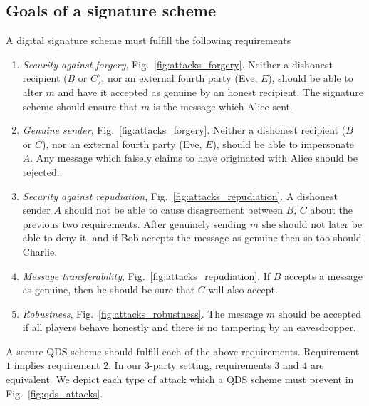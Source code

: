 \subsection{Goals of a signature scheme}\label{sec:qds_goals}

A digital signature scheme must fulfill the following requirements

\begin{mylist}
\begin{enumerate}
\item\emph{Security against forgery}, Fig.~\ref{fig:attacks_forgery}. Neither a dishonest recipient ($B$ or $C$), nor an external fourth party (Eve, $E$), should be able to alter $m$ and have it accepted as genuine by an honest recipient. The signature scheme should ensure that $m$ is the message which Alice sent.

\item\emph{Genuine sender}, Fig.~\ref{fig:attacks_forgery}. Neither a dishonest recipient ($B$ or $C$), nor an external fourth party (Eve, $E$), should be able to impersonate $A$. Any message which falsely claims to have originated with Alice should be rejected.

\item\emph{Security against repudiation}, Fig.~\ref{fig:attacks_repudiation}. A dishonest sender $A$ should not be able to cause disagreement between $B$, $C$ about the previous two requirements. After genuinely sending $m$ she should not later be able to deny it, and if Bob accepts the message as genuine then so too should Charlie. 

\item \emph{Message transferability}, Fig.~\ref{fig:attacks_repudiation}. If $B$ accepts a message as genuine, then he should be sure that $C$ will also accept.

\item \emph{Robustness}, Fig.~\ref{fig:attacks_robustness}. The message $m$ should be accepted if all players behave honestly and there is no tampering by an eavesdropper.
\end{enumerate}
\caption{\label{list:qds_requirements} A secure QDS scheme should fulfill each of the above requirements. Requirement $1$ implies requirement $2$. In our $3$-party setting, requirements $3$ and $4$ are equivalent. We depict each type of attack which a QDS scheme must prevent in Fig.~\ref{fig:qds_attacks}.}
\end{mylist}


